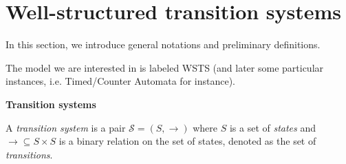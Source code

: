 

\newcommand{\Bad}{\textsf{Bad}}
\newcommand{\Safe}{\textsf{Safe}}


\newcommand{\pred}{\textsf{pred}}
\newcommand{\post}{\textsf{post}}

\section{Well-structured transition systems}\label{section definitions}



In this section, we introduce general notations and preliminary definitions.

The model we are interested in is labeled WSTS (and later some particular instances, i.e. Timed/Counter Automata for instance).



\noindent
{\bf Transition systems}


\begin{definition}
 A {\em transition system} is a pair $\mathscr{S} = (S,\rightarrow )$ where $S$ is a set of 
 {\em states} and  
 $ {\rightarrow} \subseteq S \times S$ is a
 binary relation 
 on
 the set of states, denoted as the set of {\em transitions}. 

\iffalse
\mathieu{ Maybe add this back ?
A {\em labeled transition system} (LTS for short) is a tuple $\mathscr{S}=(S, \Sigma, \rightarrow)$ where 
$S$ is a set of {\em states}, $\Sigma$ is a (finite) set of {\em labels}, and 
${\rightarrow} \subseteq S\times \Sigma \times S$ is a 
ternary relation,
denoted as the set of {\em labeled transitions}. }
\fi
\end{definition}

